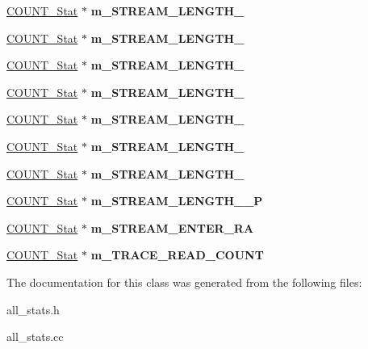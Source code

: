 \begin{DoxyCompactItemize}
\item 
\hypertarget{classall__stats__c_a6d88a6194918d02cddd41016b1127f3b}{
\hyperlink{classCOUNT__Stat}{COUNT\_\-Stat} $\ast$ {\bfseries m\_\-STREAM\_\-LENGTH\_}}
\label{classall__stats__c_a6d88a6194918d02cddd41016b1127f3b}

\item 
\hypertarget{classall__stats__c_a5fb7915e701192f842b739beb2b18a06}{
\hyperlink{classCOUNT__Stat}{COUNT\_\-Stat} $\ast$ {\bfseries m\_\-STREAM\_\-LENGTH\_}}
\label{classall__stats__c_a5fb7915e701192f842b739beb2b18a06}

\item 
\hypertarget{classall__stats__c_a43df0597b1aff6daa80e8bee2e7e8a2c}{
\hyperlink{classCOUNT__Stat}{COUNT\_\-Stat} $\ast$ {\bfseries m\_\-STREAM\_\-LENGTH\_}}
\label{classall__stats__c_a43df0597b1aff6daa80e8bee2e7e8a2c}

\item 
\hypertarget{classall__stats__c_a094da2c0964bb869b068c47c31be6b1c}{
\hyperlink{classCOUNT__Stat}{COUNT\_\-Stat} $\ast$ {\bfseries m\_\-STREAM\_\-LENGTH\_}}
\label{classall__stats__c_a094da2c0964bb869b068c47c31be6b1c}

\item 
\hypertarget{classall__stats__c_a530c7e873fbca9a402805d3167650114}{
\hyperlink{classCOUNT__Stat}{COUNT\_\-Stat} $\ast$ {\bfseries m\_\-STREAM\_\-LENGTH\_}}
\label{classall__stats__c_a530c7e873fbca9a402805d3167650114}

\item 
\hypertarget{classall__stats__c_a44d667ba151467449793f5972f72cc75}{
\hyperlink{classCOUNT__Stat}{COUNT\_\-Stat} $\ast$ {\bfseries m\_\-STREAM\_\-LENGTH\_}}
\label{classall__stats__c_a44d667ba151467449793f5972f72cc75}

\item 
\hypertarget{classall__stats__c_a4f8013e7d258ba858421c8d159df149d}{
\hyperlink{classCOUNT__Stat}{COUNT\_\-Stat} $\ast$ {\bfseries m\_\-STREAM\_\-LENGTH\_}}
\label{classall__stats__c_a4f8013e7d258ba858421c8d159df149d}

\item 
\hypertarget{classall__stats__c_a74c90d54a51eee6c0ab492e321790b01}{
\hyperlink{classCOUNT__Stat}{COUNT\_\-Stat} $\ast$ {\bfseries m\_\-STREAM\_\-LENGTH\_\_\-P}}
\label{classall__stats__c_a74c90d54a51eee6c0ab492e321790b01}

\item 
\hypertarget{classall__stats__c_a09630fedaba8ab502536d698ce2e4b42}{
\hyperlink{classCOUNT__Stat}{COUNT\_\-Stat} $\ast$ {\bfseries m\_\-STREAM\_\-ENTER\_\-RA}}
\label{classall__stats__c_a09630fedaba8ab502536d698ce2e4b42}

\item 
\hypertarget{classall__stats__c_a6caebb3737ad215583041bd15693d418}{
\hyperlink{classCOUNT__Stat}{COUNT\_\-Stat} $\ast$ {\bfseries m\_\-TRACE\_\-READ\_\-COUNT}}
\label{classall__stats__c_a6caebb3737ad215583041bd15693d418}

\end{DoxyCompactItemize}


The documentation for this class was generated from the following files:\begin{DoxyCompactItemize}
\item 
all\_\-stats.h\item 
all\_\-stats.cc\end{DoxyCompactItemize}
